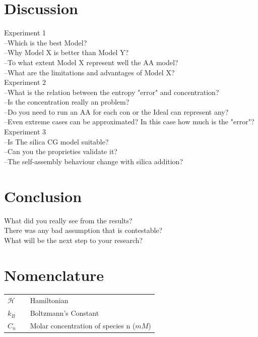\documentclass[10pt,a4paper,twoside]{article}
\begin{document}
\section{Discussion}


Experiment 1\\
 --Which is the best Model?\\
 --Why Model X is better than Model Y?\\
 --To what extent Model X represent well the AA model?\\
 --What are the limitations and advantages of Model X?\\
Experiment 2\\
 --What is the relation between the entropy "error" and concentration? \\
 --Is the concentration really an problem?\\
 --Do you need to run an AA for each con or the Ideal can represent any?\\
 --Even extreme cases can be approximated? In this case how much is the "error"?\\
Experiment 3\\
 --Is The silica CG model suitable? \\
 --Can you the proprieties validate it?\\
 --The self-assembly behaviour change with silica addition?\\

\section{Conclusion}

 What did you really see from the results?\\
 There was any bad assumption that is contestable?\\
 What will be the next step to your research? \\
 
\section{Nomenclature} 
   \begin{tabulary}{1.0\textwidth}{LCL}
   $\mathcal{H}$ &   & Hamiltonian \\
   $k_B$ & & Boltzmann's Constant\\
   $C_n$ &   & Molar concentration of species n ($mM$) \\
   \end{tabulary}
\end{document}
